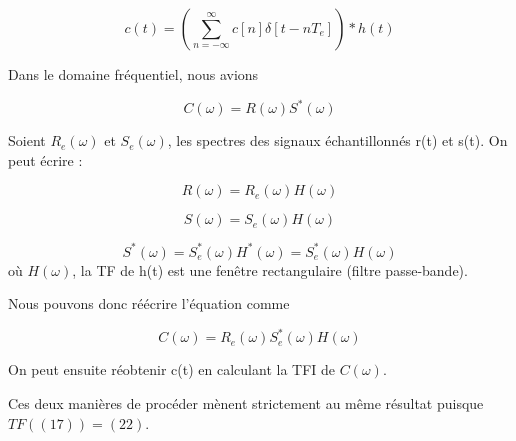 \documentclass[10pt,a4paper]{article}
\begin{document}
\begin{equation}
c(t)=(\sum_{n=-\infty}^{\infty}c[n]\delta[t-nT_{e}])*h(t)
\end{equation}

Dans le domaine fréquentiel, nous avions

\begin{equation}
C(\omega)=R(\omega)S^{*}(\omega)
\end{equation}

Soient $R_{e}(\omega)$ et $S_{e}(\omega)$, les spectres des signaux échantillonnés r(t) et s(t). On peut écrire :

\begin{equation}
R(\omega)=R_{e}(\omega)H(\omega)
\end{equation}

\begin{equation}
S(\omega)=S_{e}(\omega)H(\omega)
\end{equation}

\begin{equation}
S^{*}(\omega)=S_{e}^{*}(\omega)H^{*}(\omega)=S_{e}^{*}(\omega)H(\omega)
\end{equation}
où $H(\omega)$, la TF de h(t) est une fenêtre rectangulaire (filtre passe-bande).

Nous pouvons donc réécrire l'équation comme

\begin{equation}
C(\omega)=R_{e}(\omega)S_{e}^{*}(\omega)H(\omega)
\end{equation}

On peut ensuite réobtenir c(t) en calculant la TFI de $C(\omega)$.

Ces deux manières de procéder mènent strictement au même résultat puisque $TF((17))=(22)$.
\end{document}
